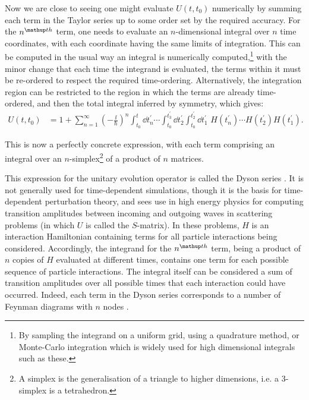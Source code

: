 Now we are close to seeing one might evaluate $U(t, t_0)$ numerically by summing each term in the Taylor series up to some order set by the required accuracy. For the $n^{\up{th}}$ term, one needs to evaluate an $n$-dimensional integral over $n$ time coordinates, with each coordinate having the same limits of integration. This can be computed in the usual way an integral is numerically computed,\footnote{By sampling the integrand on a uniform grid, using a quadrature method, or Monte-Carlo integration \cite{weinzierl_introduction_2000} which is widely used for high dimensional integrals such as these.} with the minor change that each time the integrand is evaluated, the terms within it must be re-ordered to respect the required time-ordering. Alternatively, the integration region can be restricted to the region in which the terms are already time-ordered, and then the total integral inferred by symmetry, which gives:
\begin{align}\label{eq:dyson_series}
U(t, t_0)
&= 1 + \sum_{n=1}^\infty \left(-\frac \ii \hbar \right)^n
\int_{t_0}^t \dd t_n^\prime
\cdots
\int_{t_0}^{t^\prime_3} \dd t_2^\prime
\int_{t_0}^{t^\prime_2} \dd t_1^\prime
\,\,
H(t_n^\prime)\cdots H(t_2^\prime)H(t_1^\prime).
\end{align}

This is now a perfectly concrete expression, with each term comprising an integral over an $n$-simplex\footnote{A simplex is the generalisation of a triangle to higher dimensions, i.e. a 3-simplex is a tetrahedron.} of a product of $n$ matrices.

This expression for the unitary evolution operator is called the Dyson series \cite{dyson_s_1949}. It is not generally used for time-dependent simulations, though it is the basis for time-dependent perturbation theory, and sees use in high energy physics \cite{kaplunovsky_perturbation_2016,dyson_s_1949} for computing transition amplitudes between incoming and outgoing waves in scattering problems (in which $U$ is called the $S$-matrix). In these problems, $H$ is an interaction Hamiltonian containing terms for all particle interactions being considered. Accordingly, the integrand for the $n^\up{th}$ term, being a product of $n$ copies of $H$ evaluated at different times, contains one term for each possible sequence of particle interactions.
The integral itself can be considered a sum of transition amplitudes over all possible times that each interaction could have occurred. Indeed, each term in the Dyson series corresponds to a number of Feynman diagrams with $n$ nodes \cite{kaplunovsky_perturbation_2016}.

